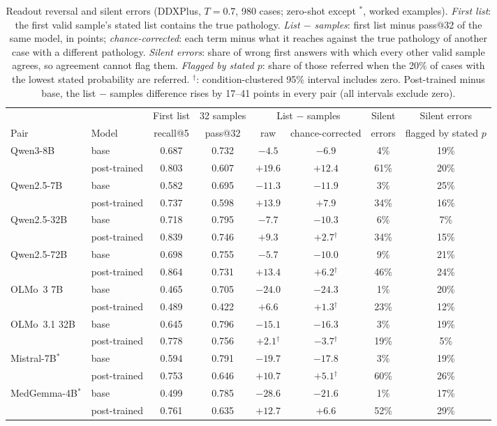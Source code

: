 \documentclass[11pt]{article}
\begin{document}
\begin{table}[t]
\centering\small
\setlength{\tabcolsep}{3.5pt}
\begin{adjustbox}{max width=\linewidth}
\begin{tabular}{llcccccc}
\toprule
 & & First list & 32 samples & \multicolumn{2}{c}{List $-$ samples} & Silent & Silent errors \\
Pair & Model & recall@5 & pass@32 & raw & chance-corrected & errors & flagged by stated $p$ \\
\midrule
Qwen3-8B & base & 0.687 & 0.732 & $-4.5$ & $-6.9$ & 4\% & 19\% \\
 & post-trained & 0.803 & 0.607 & $+19.6$ & $+12.4$ & 61\% & 20\% \\
Qwen2.5-7B & base & 0.582 & 0.695 & $-11.3$ & $-11.9$ & 3\% & 25\% \\
 & post-trained & 0.737 & 0.598 & $+13.9$ & $+7.9$ & 34\% & 16\% \\
Qwen2.5-32B & base & 0.718 & 0.795 & $-7.7$ & $-10.3$ & 6\% & 7\% \\
 & post-trained & 0.839 & 0.746 & $+9.3$ & $+2.7$$^{\dagger}$ & 34\% & 15\% \\
Qwen2.5-72B & base & 0.698 & 0.755 & $-5.7$ & $-10.0$ & 9\% & 21\% \\
 & post-trained & 0.864 & 0.731 & $+13.4$ & $+6.2$$^{\dagger}$ & 46\% & 24\% \\
OLMo~3 7B & base & 0.465 & 0.705 & $-24.0$ & $-24.3$ & 1\% & 20\% \\
 & post-trained & 0.489 & 0.422 & $+6.6$ & $+1.3$$^{\dagger}$ & 23\% & 12\% \\
OLMo~3.1 32B & base & 0.645 & 0.796 & $-15.1$ & $-16.3$ & 3\% & 19\% \\
 & post-trained & 0.778 & 0.756 & $+2.1$$^{\dagger}$ & $-3.7$$^{\dagger}$ & 19\% & 5\% \\
Mistral-7B$^{*}$ & base & 0.594 & 0.791 & $-19.7$ & $-17.8$ & 3\% & 19\% \\
 & post-trained & 0.753 & 0.646 & $+10.7$ & $+5.1$$^{\dagger}$ & 60\% & 26\% \\
MedGemma-4B$^{*}$ & base & 0.499 & 0.785 & $-28.6$ & $-21.6$ & 1\% & 17\% \\
 & post-trained & 0.761 & 0.635 & $+12.7$ & $+6.6$ & 52\% & 29\% \\
\bottomrule
\end{tabular}
\end{adjustbox}
\caption{Readout reversal and silent errors (DDXPlus, $T{=}0.7$, 980 cases; zero-shot except $^{*}$, worked examples). \emph{First list}: the first valid sample's stated list contains the true pathology. \emph{List $-$ samples}: first list minus pass@32 of the same model, in points; \emph{chance-corrected}: each term minus what it reaches against the true pathology of another case with a different pathology. \emph{Silent errors}: share of wrong first answers with which every other valid sample agrees, so agreement cannot flag them. \emph{Flagged by stated $p$}: share of those referred when the 20\% of cases with the lowest stated probability are referred. $^{\dagger}$: condition-clustered 95\% interval includes zero. Post-trained minus base, the list $-$ samples difference rises by 17--41 points in every pair (all intervals exclude zero).}

\end{table}
\end{document}
